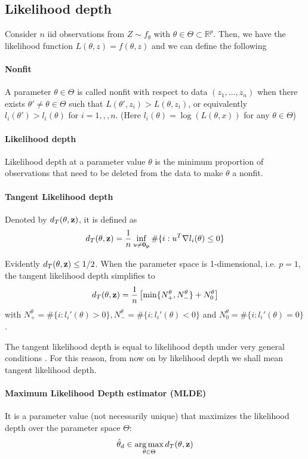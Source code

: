 \documentclass[11pt]{llncs}
\begin{document}
\subsection{Likelihood depth} Consider $n$ iid observations from $Z\sim f_\theta$ with $\theta\in\Theta\subset \mathbb{R}^p$. Then, we have the likelihood function $L(\theta,z) = f(\theta,z)$ and we can define the following \cite{mizera1}\cite{mizera2}

\paragraph{Nonfit} A parameter $\theta\in \Theta$ is called nonfit with respect to data $(z_1,...,z_n)$ when there exists $\theta'\neq \theta\in \Theta$ such that $L(\theta',z_i)>L(\theta,z_i)$, or equivalently $l_i(\theta')>l_i(\theta)$ for $i=1,,,n$. (Here $l_i(\theta) = \log(L(\theta,x))$ for any $\theta\in\Theta$)

\paragraph{Likelihood depth} Likelihood depth at a parameter value $\theta$ is the minimum proportion of observations that need to be deleted from the data to make $\theta$ a nonfit.

\paragraph{Tangent Likelihood depth} Denoted by $d_T(\theta,{\bf{z}})$, it is defined as
$$ d_T(\theta,{\bf{z}}) = \frac{1}{n}\inf_{u\neq \bf0_p} \#\{i: u^T\nabla l_i(\theta)\leq 0\} $$

Evidently $d_T(\theta,{\bf{z}}) \leq 1/2$. When the parameter space is 1-dimensional, i.e. $p=1$, the tangent likelihood depth simplifies to
$$ d_T(\theta,{\bf{z}}) = \frac{1}{n}\left[\min\{N^\theta_+,N^\theta_-\} + N_0^\theta\right] $$
with $N^\theta_+ = \#\{i: l_i'(\theta)>0\}, N^\theta_- = \#\{i: l_i'(\theta)<0\}$ and $N^\theta_0 = \#\{i: l_i'(\theta)=0\}$.

The tangent likelihood depth is equal to likelihood depth under very general conditions \cite{mizera1}. For this reason, from now on by likelihood depth we shall mean tangent likelihood depth.

\paragraph{Maximum Likelihood Depth estimator (MLDE)} It is a parameter value (not necessarily unique) that maximizes the likelihood depth over the parameter space $\Theta$:
$$ \hat\theta_d \in \operatorname*{arg\,max}_{\theta\in\Theta} d_T(\theta,{\bf{z}}) $$
\end{document}

